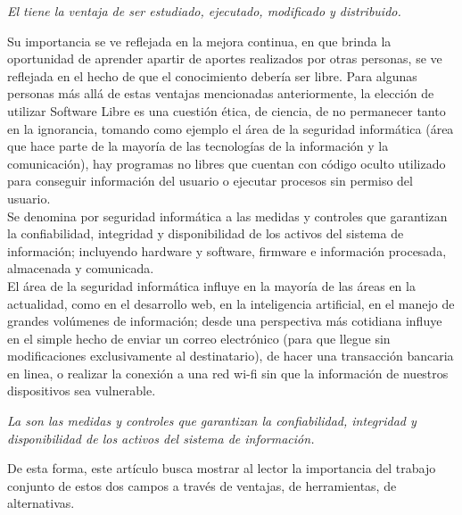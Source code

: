 \begin{multicols}{2}
\vspace{0.3cm}

\begin{entradilla}
{\em El {\color{introcolor}{Software Libre}} tiene la ventaja de ser estudiado, ejecutado, modificado y distribuido.}
\end{entradilla}

\vspace{0.3cm}

Su importancia se ve reflejada en la mejora continua, en que brinda la oportunidad de aprender apartir de aportes realizados por otras personas, se ve reflejada en el hecho de que el conocimiento debería ser libre. Para algunas personas más allá de estas ventajas mencionadas anteriormente, la elección de utilizar Software Libre es una cuestión ética, de ciencia, de no permanecer tanto en la ignorancia, tomando como ejemplo el área de la seguridad informática (área que hace parte de la mayoría de las tecnologías de la información y la comunicación), hay programas no libres que cuentan con código oculto utilizado para conseguir información del usuario o ejecutar procesos sin permiso del usuario.\\

Se denomina por seguridad informática a las medidas y controles que garantizan la confiabilidad, integridad y disponibilidad de los activos del sistema de información; incluyendo hardware y software, firmware e información procesada, almacenada y comunicada. \\

El área de la seguridad informática influye en la mayoría de las áreas en la actualidad, como en el desarrollo web, en la inteligencia artificial, en el manejo de grandes volúmenes de información; desde una perspectiva más cotidiana influye en el simple hecho de enviar un correo electrónico (para que llegue sin modificaciones exclusivamente al destinatario), de hacer una transacción bancaria en linea, o realizar la conexión a una red wi-fi sin que la información de nuestros dispositivos sea vulnerable.


\begin{entradilla}
{\em La {\color{introcolor}{seguridad informática}} son las medidas y controles que garantizan la confiabilidad, integridad y disponibilidad de los activos del sistema de información.}
\end{entradilla}

De esta forma, este artículo busca mostrar al lector la importancia del trabajo conjunto de estos dos campos a través de ventajas, de herramientas, de alternativas.


\end{multicols}
